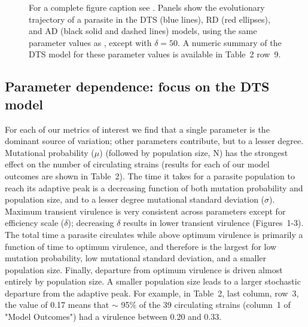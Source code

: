 \clearpage
\begin{figure}[H]
\caption{For a complete figure caption see . Panels show the evolutionary trajectory of a parasite in the DTS (blue lines), RD (red ellipses), and AD (black solid and dashed lines) models, using the same parameter values as , except with $\delta = 50$. A numeric summary of the DTS model for these parameter values is available in Table~2 row~9.} 
\label{fig:landscape3}
\end{figure} 
\clearpage

\subsection*{Parameter dependence: focus on the DTS model}

For each of our metrics of interest we find that a single parameter is the dominant source of variation; other parameters contribute, but to a lesser degree. Mutational probability ($\mu$) (followed by population size, N) has the strongest effect on the number of circulating strains (results for each of our model outcomes are shown in Table~2). The time it takes for a parasite population to reach its adaptive peak is a decreasing function of both mutation probability and population size, and to a lesser degree mutational standard deviation ($\sigma$). Maximum transient virulence is very consistent across parameters except for efficiency scale ($\delta$); decreasing $\delta$ results in lower transient virulence (Figures~1-3). The total time a parasite circulates while above optimum virulence is primarily a function of time to optimum virulence, and therefore is the largest for low mutation probability, low mutational standard deviation, and a smaller population size. Finally, departure from optimum virulence is driven almost entirely by population size. A smaller population size leads to a larger stochastic departure from the adaptive peak. For example, in Table~2, last column, row~3, the value of 0.17 means that $\sim$ 95\% of the 39 circulating strains (column~1 of "Model Outcomes") had a virulence between 0.20 and 0.33.

